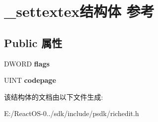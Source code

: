 \hypertarget{struct__settextex}{}\section{\+\_\+settextex结构体 参考}
\label{struct__settextex}
\subsection*{Public 属性}
\begin{DoxyCompactItemize}
\item 
\mbox{\label{struct__settextex_a8d9ef9188fb66c79d2ae2b07e4764502}} 
D\+W\+O\+RD {\bfseries flags}
\item 
\mbox{\label{struct__settextex_a304a41289fbea6c88c557a6723a01738}} 
U\+I\+NT {\bfseries codepage}
\end{DoxyCompactItemize}


该结构体的文档由以下文件生成\+:\begin{DoxyCompactItemize}
\item 
E\+:/\+React\+O\+S-\/0../sdk/include/psdk/richedit.\+h\end{DoxyCompactItemize}
